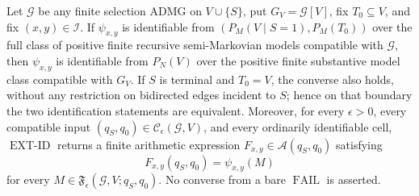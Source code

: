 Let \(\mathcal G\) be any finite selection ADMG on \(V\cup\{S\}\), put \(G_V=\mathcal G[V]\), fix \(T_0\subseteq V\), and fix \((x,y)\in\mathcal I\). If \(\psi_{x,y}\) is identifiable from \((P_M(V\mid S=1),P_M(T_0))\) over the full class of positive finite recursive semi-Markovian models compatible with \(\mathcal G\), then \(\psi_{x,y}\) is identifiable from \(P_N(V)\) over the positive finite substantive model class compatible with \(G_V\). If \(S\) is terminal and \(T_0=V\), the converse also holds, without any restriction on bidirected edges incident to \(S\); hence on that boundary the two identification statements are equivalent. Moreover, for every \(\epsilon>0\), every compatible input \((q_S,q_0)\in\mathcal C_{\epsilon}(\mathcal G,V)\), and every ordinarily identifiable cell, \(\operatorname{EXT\text{-}ID}\) returns a finite arithmetic expression \(F_{x,y}\in\mathcal A(q_S,q_0)\) satisfying
\[
 F_{x,y}(q_S,q_0)=\psi_{x,y}(M)
\]
for every \(M\in\mathfrak F_{\epsilon}(\mathcal G,V;q_S,q_0)\). No converse from a bare \(\operatorname{FAIL}\) is asserted.